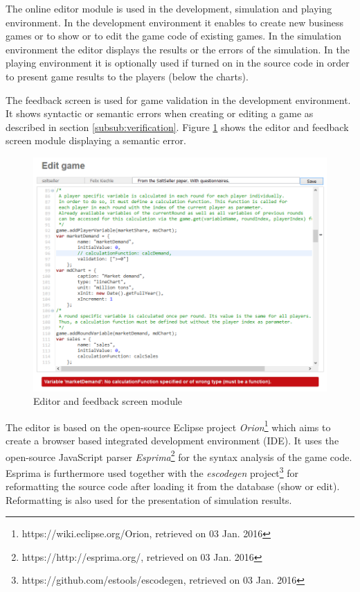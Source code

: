 The online editor module is used in the development, simulation and playing environment. In the development environment it enables to create new business games or to show or to edit the game code of existing games. In the simulation environment the editor displays the results or the errors of the simulation. In the playing environment it is optionally used if turned on in the source code in order to present game results to the players (below the charts).

The feedback screen is used for game validation in the development environment. It shows syntactic or semantic errors when creating or editing a game as described in section \ref{subsub:verification}. Figure \ref{fig:editor} shows the editor and feedback screen module displaying a semantic error.

\begin{figure}
	\centering
	\includegraphics[scale=0.61]{figures/editor.png}
	\caption{Editor and feedback screen module}
	\label{fig:editor}
\end{figure}

The editor is based on the open-source Eclipse project \textit{Orion}\footnote{https://wiki.eclipse.org/Orion, retrieved on 03 Jan. 2016} which aims to create a browser based integrated development environment (IDE). It uses the open-source JavaScript parser \textit{Esprima}\footnote{https://http://esprima.org/, retrieved on 03 Jan. 2016} for the syntax analysis of the game code. Esprima is furthermore used together with the \textit{escodegen} project\footnote{https://github.com/estools/escodegen, retrieved on 03 Jan. 2016} for reformatting the source code after loading it from the database (show or edit). Reformatting is also used for the presentation of simulation results.


